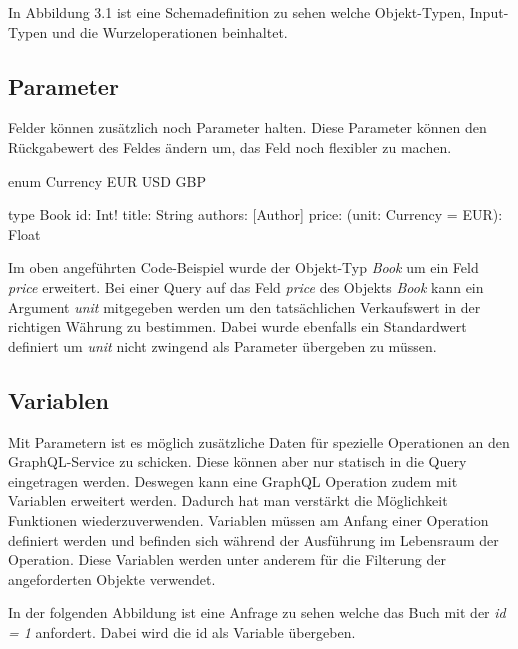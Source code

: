 In Abbildung 3.1 ist eine Schemadefinition zu sehen welche Objekt-Typen, Input-Typen und die Wurzeloperationen beinhaltet.

\subsection{Parameter}
Felder können zusätzlich noch Parameter halten.
Diese Parameter können den Rückgabewert des Feldes ändern um, das Feld noch flexibler zu machen.
\newline

\begin{JsCode}
enum Currency {
    EUR
    USD
    GBP
}

type Book {
    id: Int!
    title: String
    authors: [Author]
    price: (unit: Currency = EUR): Float
}
\end{JsCode}

Im oben angeführten Code-Beispiel wurde der Objekt-Typ \textit{Book} um ein Feld \textit{price} erweitert.
Bei einer Query auf das Feld \textit{price} des Objekts \textit{Book} kann ein Argument \textit{unit} mitgegeben werden um den tatsächlichen Verkaufswert in der richtigen Währung zu bestimmen.
Dabei wurde ebenfalls ein Standardwert definiert um \textit{unit} nicht zwingend als Parameter übergeben zu müssen.
\cite[S.62]{kress2020graphql}


\subsection{Variablen}
Mit Parametern ist es möglich zusätzliche Daten für spezielle Operationen an den GraphQL-Service zu schicken.
Diese können aber nur statisch in die Query eingetragen werden.
Deswegen kann eine GraphQL Operation zudem mit Variablen erweitert werden.
Dadurch hat man verstärkt die Möglichkeit Funktionen wiederzuverwenden.
Variablen müssen am Anfang einer Operation definiert werden und befinden sich während der Ausführung im Lebensraum der Operation.
Diese Variablen werden unter anderem für die Filterung der angeforderten Objekte verwendet.
\cite[Abs. 5.8]{graphqlOnline}
\newline

In der folgenden Abbildung ist eine Anfrage zu sehen welche das Buch mit der \textit{id = 1} anfordert. Dabei wird die id als Variable übergeben.

